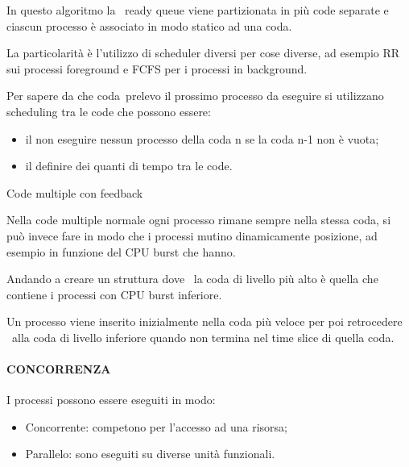 \documentclass[
]{article}
\providecommand{\tightlist}{%
  \setlength{\itemsep}{0pt}\setlength{\parskip}{0pt}}
\begin{document}
{In questo algoritmo la ~ready queue viene partizionata in più code
separate e ciascun processo è associato in modo statico ad una coda.}

{La particolarità è l'utilizzo di scheduler diversi per cose diverse, ad
esempio RR sui processi foreground e FCFS per i processi in background.}

{}

{Per sapere da che }{coda}{~prelevo il prossimo processo da eseguire si
utilizzano scheduling tra le code che possono essere:}

{}

\begin{itemize}
\tightlist
\item
  {il non eseguire nessun processo della coda n se la coda n-1 non è
  vuota;}
\item
  {il definire dei quanti di tempo tra le code.}
\end{itemize}

{}

{Code multiple con feedback}

{Nella code multiple normale ogni processo rimane sempre nella stessa
coda, si può invece fare in modo che i processi mutino dinamicamente
posizione, ad esempio in funzione del CPU burst che hanno.}

{Andando a creare un struttura dove ~la coda di livello più alto è
quella che contiene i processi con CPU burst inferiore.}

{}

{Un processo viene inserito inizialmente nella coda più veloce per poi
retrocedere ~alla coda di livello inferiore quando non termina nel time
slice di quella coda.}

{}

{}

\paragraph{\texorpdfstring{{CONCORRENZA}}{CONCORRENZA}}\label{h.uz2cn3bgavaa}

{I processi possono essere eseguiti in modo:}

{}

\begin{itemize}
\tightlist
\item
  {Concorrente: competono per l'accesso ad una risorsa;}
\item
  {Parallelo: sono eseguiti su diverse unità funzionali.}
\end{itemize}
\end{document}
